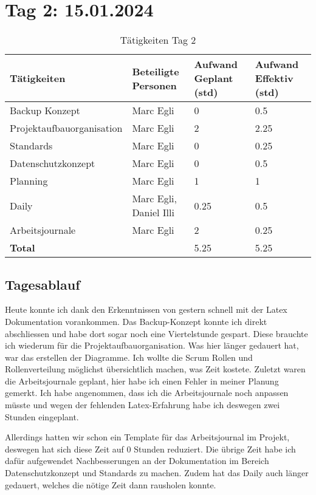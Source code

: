 \section{Tag 2: 15.01.2024}
\begin{table}[H]
    \begin{tabular}{|L{0.4\textwidth}|C{60pt}|C{60pt}|C{60pt}|}
        \hline
        \color{white}Tätigkeiten & \color{white}Beteiligte \color{white}Personen & \color{white}Aufwand Geplant (std) & \color{white}Aufwand Effektiv (std) \\
        \hline
        Backup Konzept & Marc Egli & 0 & 0.5 \\
        \hline
        Projektaufbauorganisation & Marc Egli & 2 & 2.25 \\
        \hline
        Standards & Marc Egli & 0 & 0.25 \\
        \hline
        Datenschutzkonzept & Marc Egli & 0 & 0.5 \\
        \hline
        Planning & Marc Egli & 1 & 1 \\
        \hline
        Daily & Marc Egli, Daniel Illi & 0.25 & 0.5 \\
        \hline
        Arbeitsjournale & Marc Egli & 2 & 0.25 \\
        \hline
        \textbf{Total} & & 5.25 & 5.25 \\
        \hline
    \end{tabular}
    \caption{Tätigkeiten Tag 2}
\end{table}

\subsection*{Tagesablauf}
Heute konnte ich dank den Erkenntnissen von gestern schnell mit der Latex Dokumentation
vorankommen. Das Backup-Konzept konnte ich direkt abschliessen und habe dort sogar noch eine
Viertelstunde gespart. Diese brauchte ich wiederum für die Projektaufbauorganisation. Was hier länger gedauert hat,
war das erstellen der Diagramme. Ich wollte die Scrum Rollen und Rollenverteilung möglichst übersichtlich machen, was Zeit
kostete. Zuletzt waren die Arbeitsjournale geplant, hier habe ich einen Fehler in meiner Planung gemerkt. Ich habe angenommen, dass
ich die Arbeitsjournale noch anpassen müsste und wegen der fehlenden Latex-Erfahrung habe ich deswegen zwei Stunden eingeplant.

Allerdings hatten wir schon ein Template für das Arbeitsjournal im Projekt, deswegen hat sich diese Zeit auf 0 Stunden reduziert. Die
übrige Zeit habe ich dafür aufgewendet Nachbesserungen an der Dokumentation im Bereich Datenschutzkonzept und Standards zu machen. Zudem hat
das Daily auch länger gedauert, welches die nötige Zeit dann rausholen konnte. 

